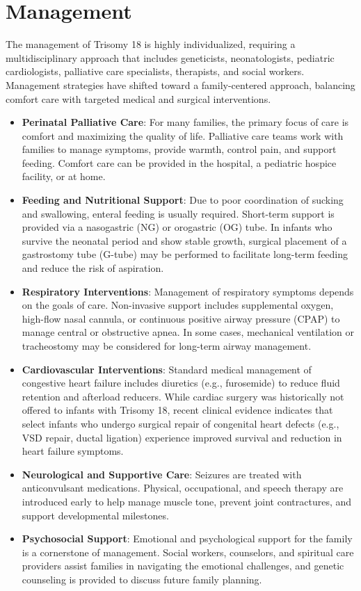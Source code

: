\section*{Management}
The management of Trisomy 18 is highly individualized, requiring a multidisciplinary approach that includes geneticists, neonatologists, pediatric cardiologists, palliative care specialists, therapists, and social workers. Management strategies have shifted toward a family-centered approach, balancing comfort care with targeted medical and surgical interventions.
\begin{itemize}
    \item \textbf{Perinatal Palliative Care}: For many families, the primary focus of care is comfort and maximizing the quality of life. Palliative care teams work with families to manage symptoms, provide warmth, control pain, and support feeding. Comfort care can be provided in the hospital, a pediatric hospice facility, or at home.
    \item \textbf{Feeding and Nutritional Support}: Due to poor coordination of sucking and swallowing, enteral feeding is usually required. Short-term support is provided via a nasogastric (NG) or orogastric (OG) tube. In infants who survive the neonatal period and show stable growth, surgical placement of a gastrostomy tube (G-tube) may be performed to facilitate long-term feeding and reduce the risk of aspiration.
    \item \textbf{Respiratory Interventions}: Management of respiratory symptoms depends on the goals of care. Non-invasive support includes supplemental oxygen, high-flow nasal cannula, or continuous positive airway pressure (CPAP) to manage central or obstructive apnea. In some cases, mechanical ventilation or tracheostomy may be considered for long-term airway management.
    \item \textbf{Cardiovascular Interventions}: Standard medical management of congestive heart failure includes diuretics (e.g., furosemide) to reduce fluid retention and afterload reducers. While cardiac surgery was historically not offered to infants with Trisomy 18, recent clinical evidence indicates that select infants who undergo surgical repair of congenital heart defects (e.g., VSD repair, ductal ligation) experience improved survival and reduction in heart failure symptoms.
    \item \textbf{Neurological and Supportive Care}: Seizures are treated with anticonvulsant medications. Physical, occupational, and speech therapy are introduced early to help manage muscle tone, prevent joint contractures, and support developmental milestones.
    \item \textbf{Psychosocial Support}: Emotional and psychological support for the family is a cornerstone of management. Social workers, counselors, and spiritual care providers assist families in navigating the emotional challenges, and genetic counseling is provided to discuss future family planning.
\end{itemize}

